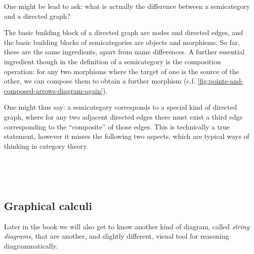 
One might be lead to ask: what is actually the difference between a semicategory and a directed graph?

The basic building block of a directed graph are nodes and directed edges, and the basic building blocks of semicategories are objects and morphisms.
So far, these are the same ingredients, apart from name differences.
A further essential ingredient though in the definition of a semicategory is the composition operation: for any two morphisms where the target of one is the source of the other, we can compose them to obtain a further morphism (c.f.
\cref{fig:points-and-composed-arrows-diagram-again}).

\begin{marginfigure}
    \centering
    \caption{}
    \label{fig:points-and-composed-arrows-diagram-again}
\end{marginfigure}

One might thus say: a semicategory corresponds to a special kind of directed graph, where for any two adjacent directed edges there must exist a third edge corresponding to the ``composite'' of those edges.
This is technically a true statement, however it misses the following two aspects, which are typical ways of thinking in category theory.

\

\

\subsection{Graphical calculi}


Later in the book we will also get to know another kind of diagram, called \emph{string diagrams}, that are another, and slightly different, visual tool for reasoning diagrammatically.

